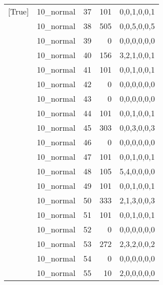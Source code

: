 \begin{tabular}{llrrl}
 [True]          & 10\_normal           &            37 &                   101 & 0,0,1,0,0,1   \\
 [True]          & 10\_normal           &            38 &                   505 & 0,0,5,0,0,5   \\
 [True]          & 10\_normal           &            39 &                     0 & 0,0,0,0,0,0   \\
 [True]          & 10\_normal           &            40 &                   156 & 3,2,1,0,0,1   \\
 [True]          & 10\_normal           &            41 &                   101 & 0,0,1,0,0,1   \\
 [True]          & 10\_normal           &            42 &                     0 & 0,0,0,0,0,0   \\
 [True]          & 10\_normal           &            43 &                     0 & 0,0,0,0,0,0   \\
 [True]          & 10\_normal           &            44 &                   101 & 0,0,1,0,0,1   \\
 [True]          & 10\_normal           &            45 &                   303 & 0,0,3,0,0,3   \\
 [True]          & 10\_normal           &            46 &                     0 & 0,0,0,0,0,0   \\
 [True]          & 10\_normal           &            47 &                   101 & 0,0,1,0,0,1   \\
 [True]          & 10\_normal           &            48 &                   105 & 5,4,0,0,0,0   \\
 [True]          & 10\_normal           &            49 &                   101 & 0,0,1,0,0,1   \\
 [True]          & 10\_normal           &            50 &                   333 & 2,1,3,0,0,3   \\
 [True]          & 10\_normal           &            51 &                   101 & 0,0,1,0,0,1   \\
 [True]          & 10\_normal           &            52 &                     0 & 0,0,0,0,0,0   \\
 [True]          & 10\_normal           &            53 &                   272 & 2,3,2,0,0,2   \\
 [True]          & 10\_normal           &            54 &                     0 & 0,0,0,0,0,0   \\
 [True]          & 10\_normal           &            55 &                    10 & 2,0,0,0,0,0   \\

\end{tabular}
